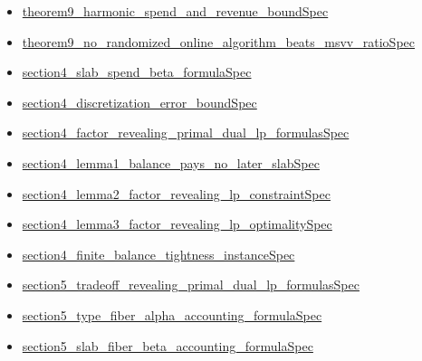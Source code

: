 \documentclass[10pt]{article}
\begin{document}
\begin{itemize}[leftmargin=1.2em]
\begin{itemize}[leftmargin=1.2em]
\item \hyperlink{source-claim-8b60e42d042bbf22}{theorem9\_\allowbreak{}harmonic\_\allowbreak{}spend\_\allowbreak{}and\_\allowbreak{}revenue\_\allowbreak{}bound\allowbreak{}Spec}
\item \hyperlink{source-claim-5b5b88f1e98a5b03}{theorem9\_\allowbreak{}no\_\allowbreak{}randomized\_\allowbreak{}online\_\allowbreak{}algorithm\_\allowbreak{}beats\_\allowbreak{}msvv\_\allowbreak{}ratio\allowbreak{}Spec}
\item \hyperlink{source-claim-baeba03c02061049}{section4\_\allowbreak{}slab\_\allowbreak{}spend\_\allowbreak{}beta\_\allowbreak{}formula\allowbreak{}Spec}
\item \hyperlink{source-claim-8b1a72efd54f0261}{section4\_\allowbreak{}discretization\_\allowbreak{}error\_\allowbreak{}bound\allowbreak{}Spec}
\item \hyperlink{source-claim-65502edca00c2622}{section4\_\allowbreak{}factor\_\allowbreak{}revealing\_\allowbreak{}primal\_\allowbreak{}dual\_\allowbreak{}lp\_\allowbreak{}formulas\allowbreak{}Spec}
\item \hyperlink{source-claim-ba169acec000963c}{section4\_\allowbreak{}lemma1\_\allowbreak{}balance\_\allowbreak{}pays\_\allowbreak{}no\_\allowbreak{}later\_\allowbreak{}slab\allowbreak{}Spec}
\item \hyperlink{source-claim-156f8b772d6e0747}{section4\_\allowbreak{}lemma2\_\allowbreak{}factor\_\allowbreak{}revealing\_\allowbreak{}lp\_\allowbreak{}constraint\allowbreak{}Spec}
\item \hyperlink{source-claim-44c0f6f2d0adaf12}{section4\_\allowbreak{}lemma3\_\allowbreak{}factor\_\allowbreak{}revealing\_\allowbreak{}lp\_\allowbreak{}optimality\allowbreak{}Spec}
\item \hyperlink{source-claim-5de8039797e4d932}{section4\_\allowbreak{}finite\_\allowbreak{}balance\_\allowbreak{}tightness\_\allowbreak{}instance\allowbreak{}Spec}
\item \hyperlink{source-claim-f07febc56b86dab1}{section5\_\allowbreak{}tradeoff\_\allowbreak{}revealing\_\allowbreak{}primal\_\allowbreak{}dual\_\allowbreak{}lp\_\allowbreak{}formulas\allowbreak{}Spec}
\item \hyperlink{source-claim-62bca80af2d9477b}{section5\_\allowbreak{}type\_\allowbreak{}fiber\_\allowbreak{}alpha\_\allowbreak{}accounting\_\allowbreak{}formula\allowbreak{}Spec}
\item \hyperlink{source-claim-73808f65722d1521}{section5\_\allowbreak{}slab\_\allowbreak{}fiber\_\allowbreak{}beta\_\allowbreak{}accounting\_\allowbreak{}formula\allowbreak{}Spec}

\end{itemize}
\end{itemize}
\end{document}

